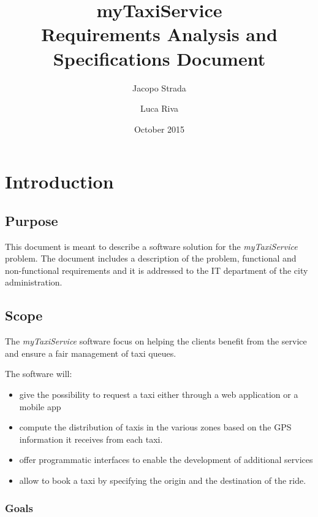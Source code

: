 \documentclass[a4paper]{article}
\title{{\Huge myTaxiService} \\ Requirements Analysis and Specifications Document}
\author{Jacopo Strada \and Luca Riva}
\date{October 2015}
\begin{document}
\maketitle

\newpage

\tableofcontents

\newpage

\listoffigures 

\listoftables

\newpage

\section{Introduction}
\subsection{Purpose}
This document is meant to describe a software solution for the \emph{myTaxiService} problem. The document includes a description of the problem, functional and non-functional requirements and it is addressed to the IT department of the city administration.

\subsection{Scope}
The \emph{myTaxiService} software focus on helping the clients benefit from the service and ensure a fair management of taxi queues.

The software will:

\begin{itemize}
\item give the possibility to request a taxi either through a web application or a mobile app
\item compute the distribution of taxis in the various zones based on the GPS information it receives from each taxi.
\item offer programmatic interfaces to enable the development of additional services
\item allow to book a taxi by specifying the origin and the destination of the ride.
\end{itemize}

\subsubsection{Goals}
\end{document}
